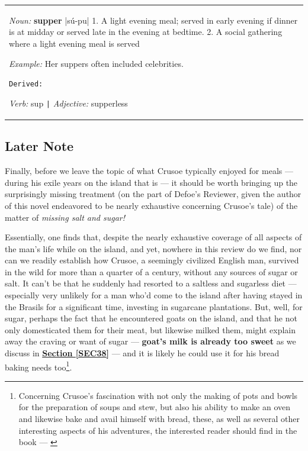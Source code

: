\documentclass[a4paper]{article}
\begin{document}
\begin{table}[ht]
  \centering
  \begin{tabular}{|p{}}

    \textit{Noun:} \textbf{supper}
|sú-pu|
	1. A light evening meal; served in early evening if dinner is at midday or served late in the evening at bedtime.
	2. A social gathering where a light evening meal is served 
	
\textit{Example:}  Her suppers often included celebrities.
	
\texttt{Derived:}

\textit{Verb:} sup \verb$|$ \textit{Adjective:} supperless\\

  \end{tabular}
\end{table}


\subsection{Later Note}


Finally, before we leave the topic of what Crusoe typically enjoyed for meals --- during his exile years on the island that is --- it should be worth bringing up the surprisingly missing treatment (on the part of Defoe's Reviewer, given the author of this novel endeavored to be nearly exhaustive concerning Crusoe's tale) of the matter of \textit{missing salt and sugar!}

Essentially, one finds that, despite the nearly exhaustive coverage of all aspects of the man's life while on the island, and yet, nowhere in this review do we find, nor can we readily establish how Crusoe, a seemingly civilized English man, survived in the wild for more than a quarter of a century, without any sources of sugar or salt. It can't be that he suddenly had resorted to a saltless and sugarless diet --- especially very unlikely for a man who'd come to the island after having stayed in the Brasils for a significant time, investing in sugarcane plantations. But, well, for sugar, perhaps the fact that he encountered goats on the island, and that he not only domesticated them for their meat, but likewise milked them, might explain away the craving or want of sugar --- \textbf{goat's milk is already too sweet} as we discuss in \textbf{\hyperref[SEC38]{Section \ref{SEC38}}} --- and it is likely he could use it for his bread baking needs too\footnote{Concerning Crusoe's fascination with not only the making of pots and bowls for the preparation of soups and stew, but also his ability to make an oven and likewise bake and avail himself with bread, these, as well as several other interesting aspects of his adventures, the interested reader should find in the book --- \cite{Defoe2007}}. 
\end{document}
